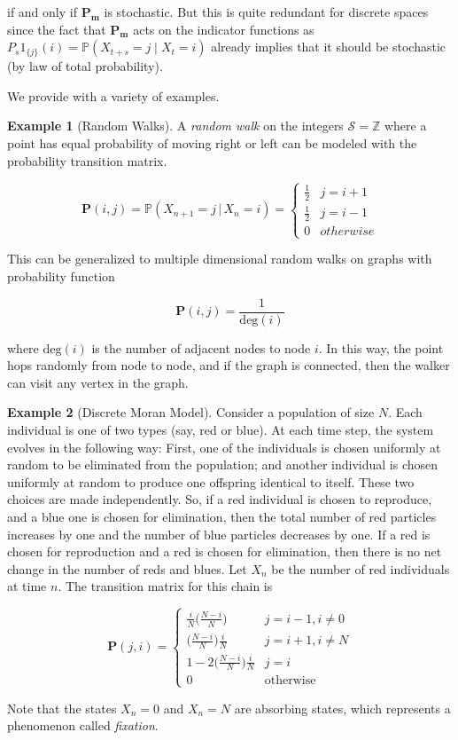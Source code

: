 \documentclass{article}
\theoremstyle{definition}
\newtheorem{example}{Example}[section]
\theoremstyle{remark}
\theoremstyle{definition}
\begin{document}
  if and only if $\mathbf{P_m}$ is stochastic. But this is quite redundant for discrete spaces since the fact that $\mathbf{P_m}$ acts on the indicator functions as $P_s 1_{\{j\}} (i) = \mathbb{P}(X_{t + s} = j \mid X_t = i)$ already implies that it should be stochastic (by law of total probability). 

  We provide with a variety of examples. 

  \begin{example}[Random Walks]
    A \textit{random walk} on the integers $\mathcal{S} = \mathbb{Z}$ where a point has equal probability of moving right or left can be modeled with the probability transition matrix. 

      \[\mathbf{P}(i, j) = \mathbb{P}(X_{n+1} = j \, | \, X_n = i) = \begin{cases}
      \frac{1}{2} & j = i + 1 \\
      \frac{1}{2} & j = i - 1\\
      0 & otherwise
      \end{cases}\]

    This can be generalized to multiple dimensional random walks on graphs with probability function 

      \[\mathbf{P}(i, j) = \frac{1}{\text{deg}(i)}\]

    where $\mathrm{deg}(i)$ is the number of adjacent nodes to node $i$. In this way, the point hops randomly from node to node, and if the graph is connected, then the walker can visit any vertex in the graph. 
  \end{example}

  \begin{example}[Discrete Moran Model]
    Consider a population of size $N$. Each individual is one of two types (say, red or blue). At each time step, the system evolves in the following way: First, one of the individuals is chosen uniformly at random to be eliminated from the population; and another individual is chosen uniformly at random to produce one offspring identical to itself. These two choices are made independently. So, if a red individual is chosen to reproduce, and a blue one is chosen for elimination, then the total number of red particles increases by one and the number of blue particles decreases by one. If a red is chosen for reproduction and a red is chosen for elimination, then there is no net change in the number of reds and blues. Let $X_n$ be the number of red individuals at time $n$. The transition matrix for this chain is

      \[\mathbf{P}(j, i) = \begin{cases}
      \frac{i}{N} \bigg(\frac{N-i}{N} \bigg) & j=i-1, i \neq 0 \\
      \bigg(\frac{N-i}{N} \bigg) \frac{i}{N} & j=i+1, i \neq N \\
      1 - 2 \bigg(\frac{N-i}{N} \bigg) \frac{i}{N} & j = i \\
      0 & \text{otherwise}
      \end{cases}\]

    Note that the states $X_n = 0$ and $X_n = N$ are absorbing states, which represents a phenomenon called \textit{fixation}. 
  \end{example}
\end{document}
